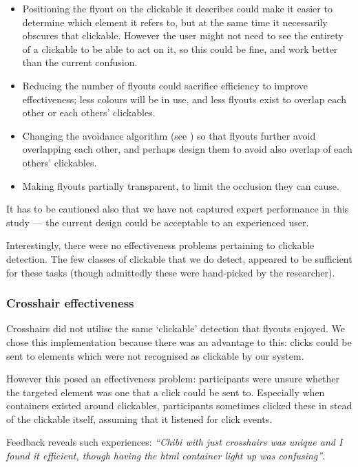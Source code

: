 \documentclass[11pt,openright,a4paper]{report}
\begin{document}
\begin{itemize}
\item Positioning the flyout on the clickable it describes could make it easier to determine which element it refers to, but at the same time it necessarily obscures that clickable. However the user might not need to see the entirety of a clickable to be able to act on it, so this could be fine, and work better than the current confusion.
\item Reducing the number of flyouts could sacrifice efficiency to improve effectiveness; less colours will be in use, and less flyouts exist to overlap each other or each others' clickables.
\item Changing the avoidance algorithm (see ) so that flyouts further avoid overlapping each other, and perhaps design them to avoid also overlap of each others' clickables.
\item Making flyouts partially transparent, to limit the occlusion they can cause.
\end{itemize}

It has to be cautioned also that we have not captured expert performance in this study --- the current design could be acceptable to an experienced user.

Interestingly, there were no effectiveness problems pertaining to clickable detection. The few classes of clickable that we do detect, appeared to be sufficient for these tasks (though admittedly these were hand-picked by the researcher).

\subsubsection{Crosshair effectiveness}
\label{sec:crosshair_effectiveness}
Crosshairs did not utilise the same `clickable' detection that flyouts enjoyed. We chose this implementation because there was an advantage to this: clicks could be sent to elements which were not recognised as clickable by our system.

However this posed an effectiveness problem: participants were unsure whether the targeted element was one that a click could be sent to. Especially when containers existed around clickables, participants sometimes clicked these in stead of the clickable itself, assuming that it listened for click events.

Feedback reveals such experiences: \textit{``Chibi with just crosshairs was unique and I found it efficient, though having the html container light up was confusing''}.
\end{document}
